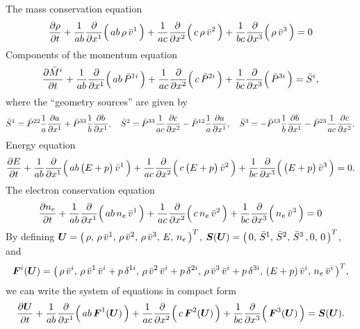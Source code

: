 \documentclass[10pt,preprint]{aastex}
\begin{document}
The mass conservation equation
\begin{equation}
  \frac{\partial \rho}{\partial t}
  +\frac{1}{ab}\frac{\partial }{\partial x^{1}}\Big(\,ab\,\rho\,\bar{v}^{1}\,\Big)
  +\frac{1}{ac}\frac{\partial }{\partial x^{2}}\Big(\,c\,\rho\,\bar{v}^{2}\,\Big)
  +\frac{1}{bc}\frac{\partial }{\partial x^{3}}\Big(\,\rho\,\bar{v}^{3}\,\Big)=0
\end{equation}
Components of the momentum equation
\begin{equation}
  \frac{\partial \bar{M}^{i}}{\partial t}
  +\frac{1}{ab}\frac{\partial }{\partial x^{1}}\Big(\,ab\,\bar{P}^{1i}\,\Big)
  +\frac{1}{ac}\frac{\partial }{\partial x^{2}}\Big(\,c\,\bar{P}^{2i}\,\Big)
  +\frac{1}{bc}\frac{\partial }{\partial x^{3}}\Big(\,\bar{P}^{3i}\,\Big)
  =\bar{S}^{i},
\end{equation}
where the ``geometry sources'' are given by
\small
\begin{equation}
  \bar{S}^{1}
  =\bar{P}^{22}\frac{1}{a}\frac{\partial a}{\partial x^{1}}+\bar{P}^{33}\frac{1}{b}\frac{\partial b}{\partial x^{1}}, \quad
  \bar{S}^{2}
  =\bar{P}^{33}\frac{1}{ac}\frac{\partial c}{\partial x^{2}}-\bar{P}^{12}\frac{1}{a}\frac{\partial a}{\partial x^{1}}, \quad
  \bar{S}^{3}
  =-\bar{P}^{13}\frac{1}{b}\frac{\partial b}{\partial x^{1}}-\bar{P}^{23}\frac{1}{ac}\frac{\partial c}{\partial x^{2}}.  
\end{equation}
\normalsize
Energy equation
\begin{equation}
  \frac{\partial E}{\partial t}
  +\frac{1}{ab}\frac{\partial }{\partial x^{1}}\Big(\,ab\,\big(E+p\big)\,\bar{v}^{1}\,\Big)
  +\frac{1}{ac}\frac{\partial }{\partial x^{2}}\Big(\,c\,\big(E+p\big)\,\bar{v}^{2}\,\Big)
  +\frac{1}{bc}\frac{\partial }{\partial x^{3}}\Big(\,\big(E+p\big)\,\bar{v}^{3}\,\Big)=0.  
\end{equation}
The electron conservation equation
\begin{equation}
  \frac{\partial n_{e}}{\partial t}
  +\frac{1}{ab}\frac{\partial }{\partial x^{1}}\Big(\,ab\,n_{e}\,\bar{v}^{1}\,\Big)
  +\frac{1}{ac}\frac{\partial }{\partial x^{2}}\Big(\,c\,n_{e}\,\bar{v}^{2}\,\Big)
  +\frac{1}{bc}\frac{\partial }{\partial x^{3}}\Big(\,n_{e}\,\bar{v}^{3}\,\Big)=0
\end{equation}
By defining $\boldsymbol{U}=\big(\,\rho,\,\rho\,\bar{v}^{1},\,\rho\,\bar{v}^{2},\,\rho\,\bar{v}^{3},\,E,\,n_{e}\,\big)^{T}$, $\boldsymbol{S}(\boldsymbol{U})=\big(\,0,\,\bar{S}^{1},\,\bar{S}^{2},\,\bar{S}^{3}\,,0,\,0\,\big)^{T}$, and
\begin{equation}
  \boldsymbol{F}^{i}(\boldsymbol{U})
  =\big(\,\rho\,\bar{v}^{i},\,\rho\,\bar{v}^{1}\,\bar{v}^{i}+p\,\delta^{1i},\,\rho\,\bar{v}^{2}\,\bar{v}^{i}+p\,\delta^{2i},\,\rho\,\bar{v}^{3}\,\bar{v}^{i}+p\,\delta^{3i},\,(E+p)\,\bar{v}^{i},\,n_{e}\,\bar{v}^{i}\,\big)^{T},
\end{equation}
we can write the system of equations in compact form
\begin{equation}
  \frac{\partial \boldsymbol{U}}{\partial t}
  +\frac{1}{ab}\frac{\partial }{\partial x^{1}}\Big(\,ab\,\boldsymbol{F}^{1}(\boldsymbol{U})\,\Big)
  +\frac{1}{ac}\frac{\partial }{\partial x^{2}}\Big(\,c\,\boldsymbol{F}^{2}(\boldsymbol{U})\,\Big)
  +\frac{1}{bc}\frac{\partial }{\partial x^{3}}\Big(\,\boldsymbol{F}^{3}(\boldsymbol{U})\,\Big)
  =\boldsymbol{S}(\boldsymbol{U}).
  \label{eq:extendedEulerCompact}
\end{equation}
\end{document}
